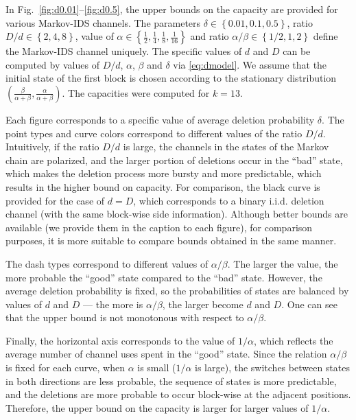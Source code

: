 \documentclass[journal, twocol]{IEEEtran}
\newcommand{\set}[1]{{\left\{{#1}\right\}}}
\begin{document}
In Fig.~\ref{fig:d0.01}--\ref{fig:d0.5}, the upper bounds on the capacity are provided for various Markov-IDS channels.
The parameters $\delta\in\set{0.01,0.1,0.5}$, ratio $D/d\in\set{2,4,8}$, value of $\alpha\in\set{\frac{1}{2},\frac{1}{4},\frac{1}{8},\frac{1}{16}}$ and ratio $\alpha/\beta\in\set{1/2,1,2}$ define the Markov-IDS channel uniquely.
The specific values of $d$ and $D$ can be computed by values of $D/d$, $\alpha$, $\beta$ and $\delta$ via \eqref{eq:dmodel}.
We assume that the initial state of the first block is chosen according to the stationary distribution $(\frac{\beta}{\alpha+\beta},\frac{\alpha}{\alpha+\beta})$.
The capacities were computed for $k=13$.

Each figure corresponds to a specific value of average deletion probability $\delta$. The point types and curve colors correspond to different values of the ratio $D/d$.
Intuitively, if the ratio $D/d$ is large, the channels in the states of the Markov chain are polarized, and the larger portion of deletions occur in the ``bad'' state, which makes the deletion process more bursty and more predictable, which results in the higher bound on capacity.
For comparison, the black curve is provided for the case of $d=D$, which corresponds to a binary i.i.d. deletion channel (with the same block-wise side information).
Although better bounds are available \cite{fertonani10novel} (we provide them in the caption to each figure), for comparison purposes, it is more suitable to compare bounds obtained in the same manner.

The dash types correspond to different values of $\alpha/\beta$.
The larger the value, the more probable the ``good'' state compared to the ``bad'' state. However, the average deletion probability is fixed, so the probabilities of states are balanced by values of $d$ and $D$ --- the more is $\alpha/\beta$, the larger become $d$ and $D$. One can see that the upper bound is not monotonous with respect to $\alpha/\beta$. 

Finally, the horizontal axis corresponds to the value of $1/\alpha$, which reflects the average number of channel uses spent in the ``good'' state. 
Since the relation $\alpha/\beta$ is fixed for each curve, when $\alpha$ is small ($1/\alpha$ is large), the switches between states in both directions are less probable, the sequence of states is more predictable, and the deletions are more probable to occur block-wise at the adjacent positions. Therefore, the upper bound on the capacity is larger for larger values of $1/\alpha$. 
\end{document}
